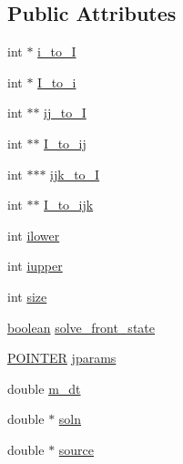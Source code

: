 \subsection*{Public Attributes}
\begin{DoxyCompactItemize}
\item 
int $\ast$ \hyperlink{class_c_i_m___p_a_r_a_b___s_o_l_v_e_r_aaa885733b95636b258806d548b762ac4}{i\+\_\+to\+\_\+I}
\item 
int $\ast$ \hyperlink{class_c_i_m___p_a_r_a_b___s_o_l_v_e_r_af41c7c8590a025efab5b0db499a3abcf}{I\+\_\+to\+\_\+i}
\item 
int $\ast$$\ast$ \hyperlink{class_c_i_m___p_a_r_a_b___s_o_l_v_e_r_a58df92b169b48b49dd101c1684729338}{ij\+\_\+to\+\_\+I}
\item 
int $\ast$$\ast$ \hyperlink{class_c_i_m___p_a_r_a_b___s_o_l_v_e_r_a9d1aa518bb670d458b4477d6d34cb003}{I\+\_\+to\+\_\+ij}
\item 
int $\ast$$\ast$$\ast$ \hyperlink{class_c_i_m___p_a_r_a_b___s_o_l_v_e_r_a86953ed012d1193352922b4ce0b6a53b}{ijk\+\_\+to\+\_\+I}
\item 
int $\ast$$\ast$ \hyperlink{class_c_i_m___p_a_r_a_b___s_o_l_v_e_r_a1a879be77a738b9b9ec27484c6f63f42}{I\+\_\+to\+\_\+ijk}
\item 
int \hyperlink{class_c_i_m___p_a_r_a_b___s_o_l_v_e_r_ac540fbb30c41b5df40df22bb23875be8}{ilower}
\item 
int \hyperlink{class_c_i_m___p_a_r_a_b___s_o_l_v_e_r_acbd2b8f2520ccb8eea2d33d0a12b2c2e}{iupper}
\item 
int \hyperlink{class_c_i_m___p_a_r_a_b___s_o_l_v_e_r_a5a840070dec5da1f6eb9fdc42d714ff9}{size}
\item 
\hyperlink{cdecs_8h_ad048433382a936258fb49e2ec4f148e1}{boolean} \hyperlink{class_c_i_m___p_a_r_a_b___s_o_l_v_e_r_a2c9947245814af07934448644a82bd0f}{solve\+\_\+front\+\_\+state}
\item 
\hyperlink{cdecs_8h_ae51a81000f343b8ec43bca1f6a723d7b}{P\+O\+I\+N\+T\+ER} \hyperlink{class_c_i_m___p_a_r_a_b___s_o_l_v_e_r_a2ae1c8af29402c998e981dfebb023d59}{jparams}
\item 
double \hyperlink{class_c_i_m___p_a_r_a_b___s_o_l_v_e_r_a87b5d3853ba1c846c0263ea4110cb74d}{m\+\_\+dt}
\item 
double $\ast$ \hyperlink{class_c_i_m___p_a_r_a_b___s_o_l_v_e_r_a98498dd04c9005638265c76ea997495e}{soln}
\item 
double $\ast$ \hyperlink{class_c_i_m___p_a_r_a_b___s_o_l_v_e_r_af4f64348a853dde56a82be580ede23da}{source}
\item 
$$
\end{DoxyCompactItemize}
